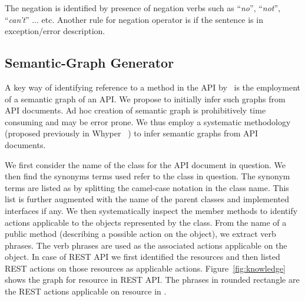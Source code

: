 The negation is identified by presence of negation verbs such as ``\textit{no}'', ``\textit{not}'', ``\textit{can't}'' ... etc. Another rule for negation operator is if the sentence is in exception/error description. 



\subsection{Semantic-Graph Generator}
\label{sub:ACA}

A key way of identifying reference to a method in the API by \tool\ is the employment of a semantic graph of an API.
We propose to initially infer such graphs from API documents.
Ad hoc creation of semantic graph is prohibitively time consuming and may be error prone.
We thus employ a systematic methodology (proposed previously in Whyper ~\cite{pandita13:WHYPER}) to infer semantic graphs from API documents.

We first consider the name of the class for the API document in question.
We then find the synonyms terms used refer to the class in question.
The synonym terms are listed as by splitting the camel-case notation in the class name.
This list is further augmented with the name of the parent classes and implemented interfaces if any. We then systematically inspect the member methods to identify actions applicable to the objects represented by the class. From the name of a public method (describing a possible action on the object), we extract verb phrases. The verb phrases are used as the associated actions applicable on the object. In case of REST API we first identified the resources and then listed REST actions on those resources as applicable actions. Figure~\ref{fig:knowledge} shows the graph for  resource in REST API. The phrases in rounded rectangle are the REST actions applicable on  resource in \amazonAPI.

